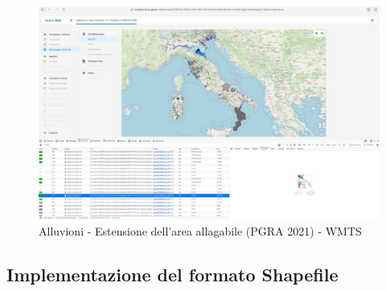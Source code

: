 \begin{figure}[htbp]
      \centering
      \includegraphics[width=1\textwidth]{Tesi/images/Capitolo5/italiaAlluvioniWMTS.jpg}
      \caption{Alluvioni - Estensione dell’area allagabile (PGRA 2021) - WMTS}
      \label{fig:italiaAlluvioniWMTS}
\end{figure}

\subsection{Implementazione del formato Shapefile}

